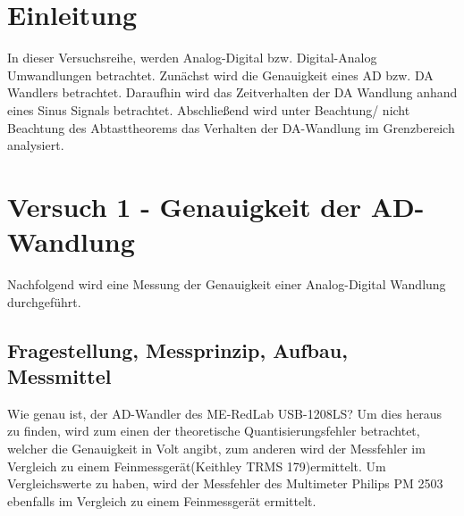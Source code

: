 \documentclass[12pt,oneside,a4paper]{report}
\begin{document}




\clearpage

%
%


%
%


%
%
%

%
%




\setcounter{page}{1}
%
%
\chapter{Einleitung}
\label{chap:EINL}
In dieser Versuchsreihe, werden Analog-Digital bzw. Digital-Analog Umwandlungen betrachtet. 
Zunächst wird die Genauigkeit eines AD bzw. DA Wandlers betrachtet. Daraufhin wird das Zeitverhalten der DA Wandlung anhand eines Sinus Signals betrachtet. Abschließend wird unter Beachtung/ nicht Beachtung des Abtasttheorems das Verhalten der DA-Wandlung im Grenzbereich analysiert.

%
%
\chapter{Versuch 1 - Genauigkeit der AD-Wandlung}
\label{chap:VERSUCH_1}
Nachfolgend wird eine Messung der Genauigkeit einer Analog-Digital Wandlung durchgeführt.

\section{Fragestellung, Messprinzip, Aufbau, Messmittel}
\label{chap:VERSUCH_1_FRAGESTELLUNG}
Wie genau ist, der AD-Wandler des ME-RedLab USB-1208LS?
Um dies heraus zu finden, wird zum einen der theoretische Quantisierungsfehler betrachtet, welcher die Genauigkeit in Volt angibt, zum anderen wird der Messfehler im Vergleich zu einem Feinmessgerät(Keithley TRMS 179)ermittelt.
Um Vergleichswerte zu haben, wird der Messfehler des Multimeter Philips PM 2503 ebenfalls im Vergleich zu einem Feinmessgerät ermittelt.
\end{document}
